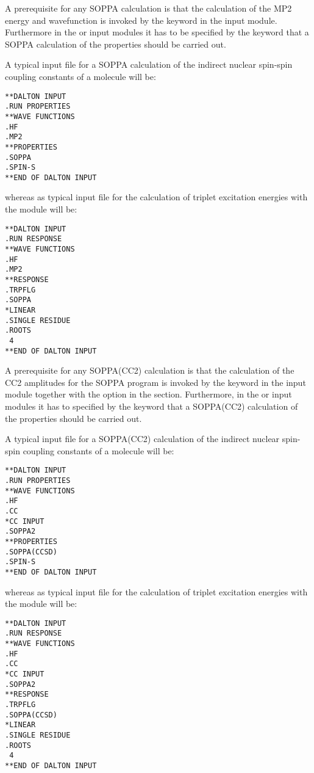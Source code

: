 A prerequisite for any SOPPA calculation is that the calculation of
the MP2 energy and wavefunction is invoked by the keyword  in
the  input module. Furthermore in the
 or  input modules it has to be specified
by the keyword  that a SOPPA calculation of the properties
should be carried out.

A typical input file for a SOPPA calculation of the indirect nuclear
spin-spin coupling constants of a molecule will be:

\begin{verbatim}
**DALTON INPUT
.RUN PROPERTIES
**WAVE FUNCTIONS
.HF
.MP2
**PROPERTIES
.SOPPA
.SPIN-S
**END OF DALTON INPUT
\end{verbatim}
whereas as typical input file for the calculation of triplet
excitation energies with the
 module will be:
\begin{verbatim}
**DALTON INPUT
.RUN RESPONSE
**WAVE FUNCTIONS
.HF
.MP2
**RESPONSE
.TRPFLG
.SOPPA
*LINEAR
.SINGLE RESIDUE
.ROOTS
 4
**END OF DALTON INPUT
\end{verbatim}


A prerequisite for any SOPPA(CC2) calculation is that
the calculation of the CC2 amplitudes for the SOPPA program is invoked
by the keyword  in the  input module
together with the  option in the  section.
Furthermore, in the  or  input modules
it has to specified by the keyword  that a SOPPA(CC2)
calculation of the properties should be carried out.

A typical input file for a SOPPA(CC2) calculation of the indirect
nuclear spin-spin coupling constants of a molecule will be:

\begin{verbatim}
**DALTON INPUT
.RUN PROPERTIES
**WAVE FUNCTIONS
.HF
.CC
*CC INPUT
.SOPPA2
**PROPERTIES
.SOPPA(CCSD)
.SPIN-S
**END OF DALTON INPUT
\end{verbatim}
whereas as typical input file for the calculation of triplet
excitation energies with the
 module will be:
\begin{verbatim}
**DALTON INPUT
.RUN RESPONSE
**WAVE FUNCTIONS
.HF
.CC
*CC INPUT
.SOPPA2
**RESPONSE
.TRPFLG
.SOPPA(CCSD)
*LINEAR
.SINGLE RESIDUE
.ROOTS
 4
**END OF DALTON INPUT
\end{verbatim}




